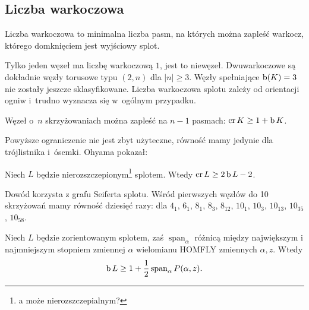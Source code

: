 
\subsection{Liczba warkoczowa}
%

\begin{definition}
\label{def:braid_number}%
    Liczba warkoczowa to minimalna liczba pasm, na których można zapleść warkocz, którego domknięciem jest wyjściowy splot.
\end{definition}

Tylko jeden węzeł ma liczbę warkoczową $1$, jest to niewęzeł.
Dwuwarkoczowe są dokładnie węzły torusowe typu $(2, n)$ dla $|n| \ge 3$.
Węzły spełniające $\operatorname{b} (K) = 3$ nie zostały jeszcze sklasyfikowane.
Liczba warkoczowa splotu zależy od orientacji ogniw i~trudno wyznacza się w~ogólnym przypadku.

\begin{proposition}
    Węzeł o~$n$ skrzyżowaniach można zapleść na $n - 1$ pasmach: $\operatorname{cr} K \ge 1 + \operatorname{b} K$.
\end{proposition}

Powyższe ograniczenie nie jest zbyt użyteczne, równość mamy jedynie dla trójlistnika i~ósemki.
Ohyama \cite{ohyama93} pokazał:
%

\begin{proposition}
    Niech $L$ będzie nierozszczepionym\footnote{a może nierozszczepialnym?} splotem.
    Wtedy $\operatorname{cr} L \ge 2 \operatorname{b} L - 2$.
\end{proposition}

Dowód korzysta z grafu Seiferta splotu.
%
Wśród pierwszych węzłów do 10 skrzyżowań mamy równość dziesięć razy: dla $4_1$, $6_1$, $8_1$, $8_3$, $8_{12}$, $10_1$, $10_3$, $10_{13}$, $10_{35}$, $10_{58}$.

\begin{proposition}
%
    Niech $L$ będzie zorientowanym splotem, zaś $\operatorname{span}_\alpha$ różnicą między największym i najmniejszym stopniem zmiennej $\alpha$ wielomianu HOMFLY zmiennych $\alpha, z$.
    Wtedy
    \begin{equation}
        \operatorname{b} L \ge 1 + \frac 1 2 \operatorname{span}_\alpha P(\alpha, z).
    \end{equation}
\end{proposition}

